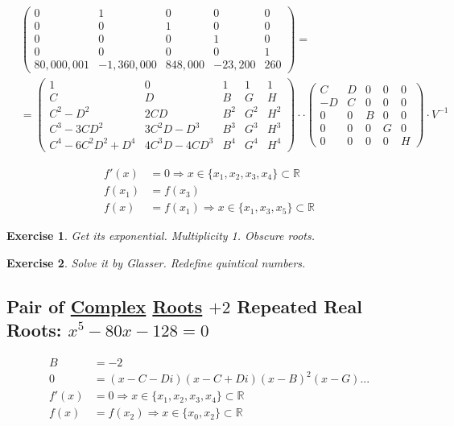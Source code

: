 \documentclass[12pt,a4paper]{article}
\newtheorem{exercise}{Exercise}[section]
\begin{document}
\begin{align}
&\left( \begin{matrix} 0&1&0&0&0 \\ 0&0&1&0&0 \\ 0&0&0&1&0 \\ 0&0&0&0&1 \\ 80,000,001 & -1,360,000 & 848,000 & -23,200 & 260 \end{matrix} \right) = \nonumber \\
&= \left( \begin{matrix} 1&0&1&1&1 \\ C&D&B&G&H \\ C^2-D^2&2CD&B^2&G^2&H^2 \\ C^3-3CD^2&3C^2D - D^3&B^3&G^3&H^3 \\ C^4-6C^2D^2 + D^4&4C^3D - 4CD^3&B^4&G^4&H^4 \end{matrix} \right) \cdot
\cdot \left( \begin{matrix} C & D&0&0&0 \\ -D & C&0&0&0 \\ 0 & 0 & B & 0 & 0 \\ 0 & 0 & 0 & G & 0 \\ 0 & 0 & 0 & 0 & H \end{matrix} \right) \cdot V^{-1}
\end{align}

\begin{align}
f'(x) &= 0 \Rightarrow x \in \{ x_1, x_2, x_3, x_4 \} \subset \mathbb{R} \\
f(x_1) &= f(x_3) \\
f(x) &= f(x_1) \Rightarrow x \in \{ x_1, x_3, x_5 \} \subset \mathbb{R}
\end{align}

\begin{exercise}
Get its exponential. Multiplicity 1. Obscure roots.
\end{exercise}

\begin{exercise}
Solve it by Glasser. Redefine quintical numbers.
\end{exercise}

\subsection{Pair of \href{}{Complex} \href{}{Roots} $+ 2$ Repeated Real Roots: $x^5 - 80 x - 128 = 0$}\label{R2RCC}

\begin{align}
B &= -2 \\
0 &= (x - C - Di)(x - C + Di)(x - B)^2 (x - G)... \\
f'(x) &= 0 \Rightarrow x \in \{ x_1, x_2, x_3, x_4 \} \subset \mathbb{R} \\
f(x) &= f(x_2) \Rightarrow x \in \{ x_0, x_2 \} \subset \mathbb{R}
\end{align}
\end{document}
